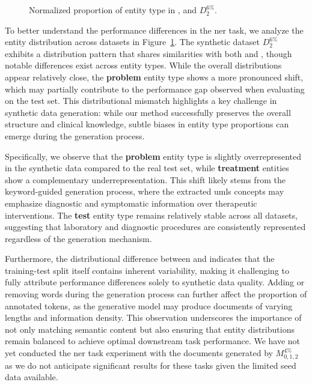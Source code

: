 \begin{figure}[!htb]
    \centering
    \resizebox{1\columnwidth}{!}{}
    \caption{Normalized proportion of entity type in \dgold, \dte and $D_{2}^{6\%}$.}
    \label{fig:ner-labels}
\end{figure}

To better understand the performance differences in the \gls{ner} task, we analyze the entity distribution across datasets in Figure~\ref{fig:ner-labels}. The synthetic dataset $D_{2}^{6\%}$ exhibits a distribution pattern that shares similarities with both \dgold and \dte, though notable differences exist across entity types.
While the overall distributions appear relatively close, the \textbf{problem} entity type shows a more pronounced shift, which may partially contribute to the performance gap observed when evaluating on the test set.
This distributional mismatch highlights a key challenge in synthetic data generation: while our method successfully preserves the overall structure and clinical knowledge, subtle biases in entity type proportions can emerge during the generation process.

Specifically, we observe that the \textbf{problem} entity type is slightly overrepresented in the synthetic data compared to the real test set, while \textbf{treatment} entities show a complementary underrepresentation. This shift likely stems from the keyword-guided generation process, where the extracted \gls{umls} concepts may emphasize diagnostic and symptomatic information over therapeutic interventions. The \textbf{test} entity type remains relatively stable across all datasets, suggesting that laboratory and diagnostic procedures are consistently represented regardless of the generation mechanism.

Furthermore, the distributional difference between \dgold and \dte indicates that the training-test split itself contains inherent variability, making it challenging to fully attribute performance differences solely to synthetic data quality. Adding or removing words during the generation process can further affect the proportion of annotated tokens, as the generative model may produce documents of varying lengths and information density. This observation underscores the importance of not only matching semantic content but also ensuring that entity distributions remain balanced to achieve optimal downstream task performance. We have not yet conducted the \gls{ner} task experiment with the documents generated by $M_{0,1,2}^{4\%}$ as we do not anticipate significant results for these tasks given the limited seed data available.

